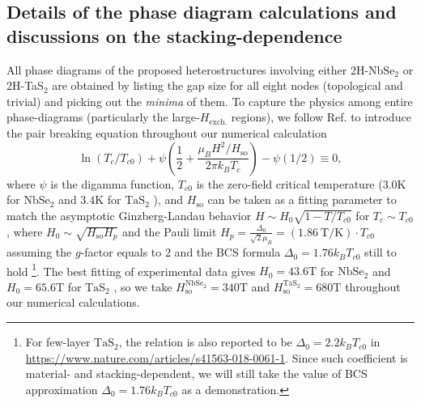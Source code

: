 \begin{subappendices}
\section{Details of the phase diagram calculations and discussions on the  stacking-dependence}\label{app:phase_diagram_details}
	All phase diagrams of the proposed heterostructures involving either 2H-NbSe$_2$ or 2H-TaS$_2$ are obtained by listing the gap size for all eight nodes (topological and trivial) and picking out the \emph{minima} of them. To capture the physics among entire phase-diagrams (particularly the large-$H_\text{exch.}$ regions), we follow Ref.\cite{xi2016ising} to introduce the pair breaking equation throughout our numerical calculation
	\begin{equation*}
		\ln(T_c/T_{c0})+\psi\left(\dfrac{1}{2}+\dfrac{\mu_B H^2/H_{\text{so}}}{2\pi k_B T_c}\right)-\psi(1/2)\equiv0,
	\end{equation*}
	where $\psi$ is the digamma function, $T_{c0}$ is the zero-field critical temperature ($3.0$K for $\mathrm{NbSe_2}$ \cite{xi2016ising} and $3.4$K for $\mathrm{TaS_2}$ \cite{yang2018enhanced}), and $H_{\text{so}}$ can be taken as a fitting parameter to match the asymptotic Ginzberg-Landau behavior $H\sim H_0\sqrt{1-T/T_{c0}}$ for $T_c\sim T_{c0}$, where $H_0\sim\sqrt{H_{\text{so}}H_p}$ and the Pauli limit  $H_p=\frac{\Delta_0}{\sqrt{2}\mu_B}=(1.86~\mathrm{T/K})\cdot T_{c0}$ assuming the $g$-factor equals to 2 and the BCS formula $\Delta_0=1.76k_B T_{c0}$ still to hold \footnote{For few-layer $\mathrm{TaS_2}$, the relation is also reported to be $\Delta_0=2.2k_B T_{c0}$ in \protect\url{https://www.nature.com/articles/s41563-018-0061-1}. Since such coefficient is material- and stacking-dependent, we will still take the value of BCS approximation $\Delta_0=1.76k_B T_{c0}$ as a demonstration.}. The best fitting of experimental data gives $H_0=43.6\mathrm{T}$ for $\mathrm{NbSe_2}$ and $H_0=65.6\mathrm{T}$ for $\mathrm{TaS_2}$ \cite{de2018tuning}, so we take $H_{\text{so}}^{\mathrm{NbSe_2}}=340\mathrm{T}$ and $H_{\text{so}}^{\mathrm{TaS_2}}=680\mathrm{T}$ throughout our numerical calculations.\par

\end{subappendices}
